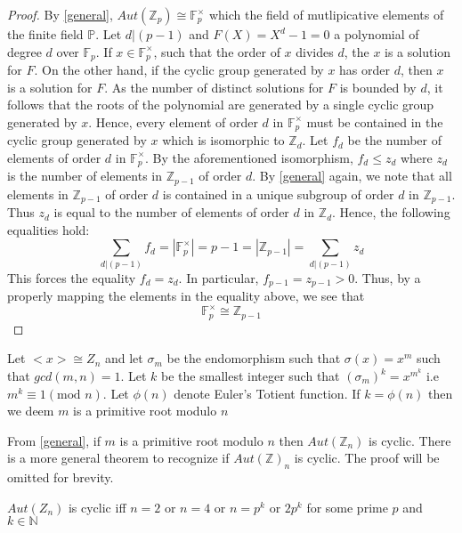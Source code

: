 \documentclass[main.tex]{subfiles}
\begin{document}
\begin{proof}
By \ref{general}, $Aut(\mathbb{Z}_p) \cong \mathbb{F}_p^{\times}$ which the field of mutlipicative elements of the finite field $\mathbb{P}$. Let $d | (p-1)$ and $F(X) = X^d - 1 = 0$ a polynomial of degree $d$ over $\mathbb{F}_p$. If $x \in \mathbb{F}_p^{\times}$, such that the order of $x$ divides $d$, the $x$ is a solution for $F$. On the other hand, if the cyclic group generated by $x$ has order $d$, then $x$ is a solution for $F$. As the number of distinct solutions for $F$ is bounded by $d$, it follows that the roots of the polynomial are generated by a single cyclic group generated by $x$. Hence, every element of order $d$  in $\mathbb{F}_p^{\times}$ must be contained in the cyclic group generated by $x$ which is isomorphic to $\mathbb{Z}_d$. Let $f_d$ be the number of elements of order $d$ in $\mathbb{F}_p^{\times}$. By the aforementioned isomorphism, $f_d \leq z_d$ where $z_d$ is the number of elements in $\mathbb{Z}_{p-1}$ of order $d$. By \ref{general} again, we note that all elements in $\mathbb{Z}_{p-1}$ of order $d$ is contained in a unique subgroup of order $d$ in $\mathbb{Z}_{p-1}$. Thus $z_d$ is equal to the number of elements of order $d$ in $\mathbb{Z}_d$.  Hence, the following equalities hold:
$$ \sum_{d | (p-1)} f_d = |\mathbb{F}_p^{\times} | = p -1 = |\mathbb{Z}_{p-1}| = \sum_{d|(p-1)} z_d $$
This forces the equality $f_d = z_d$. In particular, $f_{p-1} = z_{p-1} > 0$. Thus, by a properly mapping the elements in the equality above, we see that $$\mathbb{F}_{p}^{\times} \cong \mathbb{Z}_{p-1}$$    
\end{proof}

\begin{definition}
Let $<x> \cong Z_n$ and let $\sigma_m$ be the endomorphism such that $\sigma(x) = x^m$ such that $gcd(m,n) = 1$. Let $k$ be the smallest integer such that $(\sigma_{m})^k = x^{m^k}$ i.e $m^k \equiv 1 (\text{mod } n)$.
Let $\phi(n)$ denote Euler's Totient function. If $k = \phi(n)$ then we deem $m$ is a primitive root modulo $n$ 
\end{definition}

From \ref{general}, if $m$ is a primitive root modulo $n$ then $Aut(\mathbb{Z}_n)$ is cyclic. There is a more general theorem to recognize if $Aut(\mathbb{Z})_n$ is cyclic. The proof will be omitted for brevity.

\begin{theorem}
\label{cyclic}
$Aut(Z_n)$ is cyclic iff $n=2$ or $n=4$ or $n = p^k$ or $2p^k$ for some prime $p$ and $k \in \mathbb{N}$
\end{theorem}
\end{document}

